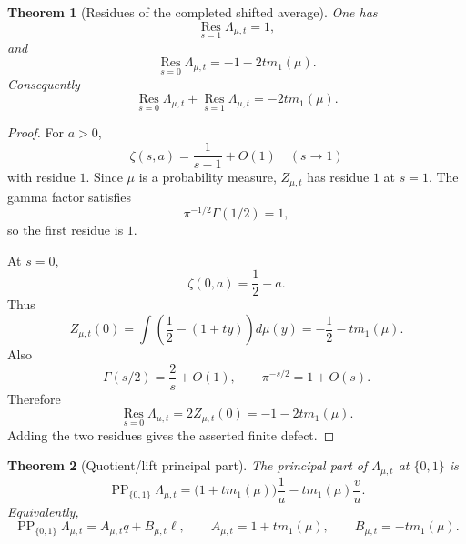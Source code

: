 \documentclass[11pt]{article}
\newcommand{\PP}{\operatorname{PP}}
\newcommand{\Res}{\operatorname*{Res}}
\newcommand{\ellp}{\ell}
\newcommand{\1}{\mathbf 1}
\newtheorem{theorem}{Theorem}[section]
\numberwithin{equation}{section}
\begin{document}
\begin{theorem}[Residues of the completed shifted average]\label{thm:hurwitz-residues}
One has
\begin{equation}
  \Res_{s=1}\Lambda_{\mu,t}=1,
\end{equation}
and
\begin{equation}
  \Res_{s=0}\Lambda_{\mu,t}=-1-2t m_1(\mu).
\end{equation}
Consequently
\begin{equation}
  \Res_{s=0}\Lambda_{\mu,t}+\Res_{s=1}\Lambda_{\mu,t}=-2t m_1(\mu).
\end{equation}
\end{theorem}

\begin{proof}
For $a>0$,
\begin{equation}
  \zeta(s,a)=\frac1{s-1}+O(1)\quad(s\to1)
\end{equation}
with residue $1$.  Since $\mu$ is a probability measure, $Z_{\mu,t}$ has residue $1$ at $s=1$.  The gamma factor satisfies
\begin{equation}
  \pi^{-1/2}\Gamma(1/2)=1,
\end{equation}
so the first residue is $1$.

At $s=0$,
\begin{equation}
  \zeta(0,a)=\frac12-a.
\end{equation}
Thus
\begin{equation}
  Z_{\mu,t}(0)=\int\left(\frac12-(1+ty)\right)d\mu(y)=-\frac12-tm_1(\mu).
\end{equation}
Also
\begin{equation}
  \Gamma(s/2)=\frac2s+O(1),
  \qquad
  \pi^{-s/2}=1+O(s).
\end{equation}
Therefore
\begin{equation}
  \Res_{s=0}\Lambda_{\mu,t}=2Z_{\mu,t}(0)=-1-2tm_1(\mu).
\end{equation}
Adding the two residues gives the asserted finite defect.
\end{proof}

\begin{theorem}[Quotient/lift principal part]\label{thm:pp-decomp}
The principal part of $\Lambda_{\mu,t}$ at $\{0,1\}$ is
\begin{equation}\label{eq:pp-decomp}
  \PP_{\{0,1\}}\Lambda_{\mu,t}
  =\bigl(1+t m_1(\mu)\bigr)\frac1u
  -t m_1(\mu)\frac vu.
\end{equation}
Equivalently,
\begin{equation}
  \PP_{\{0,1\}}\Lambda_{\mu,t}=A_{\mu,t}q+B_{\mu,t}\ellp,
  \qquad
  A_{\mu,t}=1+t m_1(\mu),
  \qquad
  B_{\mu,t}=-t m_1(\mu).
\end{equation}
\end{theorem}
\end{document}
